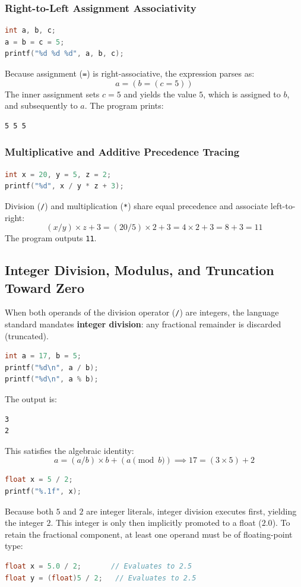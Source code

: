 \subsubsection{Right-to-Left Assignment Associativity}
\begin{lstlisting}[language=C]
int a, b, c;
a = b = c = 5;
printf("%d %d %d", a, b, c);
\end{lstlisting}
Because assignment (\texttt{=}) is right-associative, the expression parses as:
\[
a = (b = (c = 5))
\]
The inner assignment sets $c = 5$ and yields the value $5$, which is assigned to $b$, and subsequently to $a$. The program prints:
\begin{lstlisting}
5 5 5
\end{lstlisting}

\subsubsection{Multiplicative and Additive Precedence Tracing}
\begin{lstlisting}[language=C]
int x = 20, y = 5, z = 2;
printf("%d", x / y * z + 3);
\end{lstlisting}
Division (\texttt{/}) and multiplication (\texttt{*}) share equal precedence and associate left-to-right:
\[
(x / y) \times z + 3 = (20 / 5) \times 2 + 3 = 4 \times 2 + 3 = 8 + 3 = 11
\]
The program outputs \texttt{11}.

\subsection{Integer Division, Modulus, and Truncation Toward Zero}
When both operands of the division operator (\texttt{/}) are integers, the language standard mandates \textbf{integer division}: any fractional remainder is discarded (truncated).

\begin{lstlisting}[language=C]
int a = 17, b = 5;
printf("%d\n", a / b);
printf("%d\n", a % b);
\end{lstlisting}
The output is:
\begin{lstlisting}
3
2
\end{lstlisting}
This satisfies the algebraic identity:
\[
a = (a / b) \times b + (a \pmod b) \implies 17 = (3 \times 5) + 2
\]

\begin{tcolorbox}[colback=codebg,colframe=quotetext,title=\textbf{Exam Trap: Integer Division Before Floating-Point Assignment}]
\begin{lstlisting}[language=C]
float x = 5 / 2;
printf("%.1f", x);
\end{lstlisting}
Because both $5$ and $2$ are integer literals, integer division executes first, yielding the integer $2$. This integer is only then implicitly promoted to a float ($2.0$). To retain the fractional component, at least one operand must be of floating-point type:
\begin{lstlisting}[language=C]
float x = 5.0 / 2;       // Evaluates to 2.5
float y = (float)5 / 2;   // Evaluates to 2.5
\end{lstlisting}
\end{tcolorbox}

